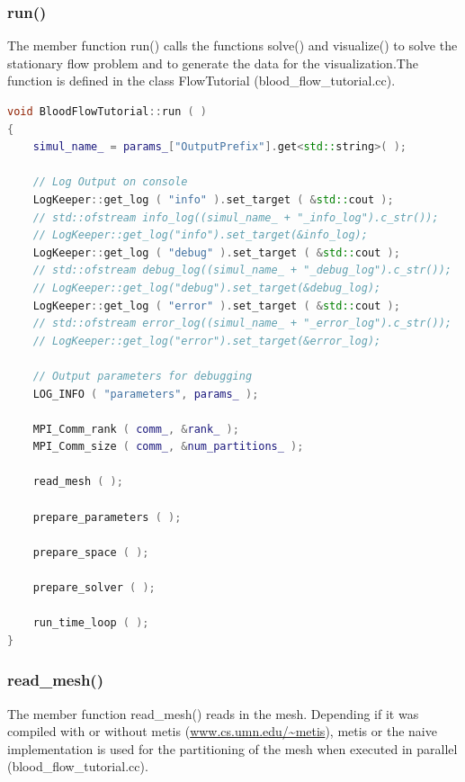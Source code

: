 \documentclass[a4paper, 11pt, twoside]{article}
\begin{document}
\subsubsection{run()}\label{run}
The member function run() calls the functions solve() and visualize() to solve the stationary flow problem and to generate the  data for the visualization.The function is defined in the class FlowTutorial (blood\_flow\_tutorial.cc).

\begin{lstlisting}[language=C++, basicstyle={\footnotesize, \ttfamily}, keywordstyle=\color{blue},  numbers=none, tabsize=4]
void BloodFlowTutorial::run ( )
{
    simul_name_ = params_["OutputPrefix"].get<std::string>( );

    // Log Output on console
    LogKeeper::get_log ( "info" ).set_target ( &std::cout );
    // std::ofstream info_log((simul_name_ + "_info_log").c_str());
    // LogKeeper::get_log("info").set_target(&info_log);
    LogKeeper::get_log ( "debug" ).set_target ( &std::cout );
    // std::ofstream debug_log((simul_name_ + "_debug_log").c_str());
    // LogKeeper::get_log("debug").set_target(&debug_log);
    LogKeeper::get_log ( "error" ).set_target ( &std::cout );
    // std::ofstream error_log((simul_name_ + "_error_log").c_str());
    // LogKeeper::get_log("error").set_target(&error_log);

    // Output parameters for debugging
    LOG_INFO ( "parameters", params_ );

    MPI_Comm_rank ( comm_, &rank_ );
    MPI_Comm_size ( comm_, &num_partitions_ );

    read_mesh ( );

    prepare_parameters ( );

    prepare_space ( );

    prepare_solver ( );

    run_time_loop ( );
}
\end{lstlisting}

\subsubsection{read\_mesh()}\label{read-mesh}
The member function read\_mesh() reads in the mesh. Depending if it was compiled with or without metis (\url{www.cs.umn.edu/~metis}), metis or the naive implementation is used for the partitioning of the mesh when executed in parallel  (blood\_flow\_tutorial.cc).
\end{document}
